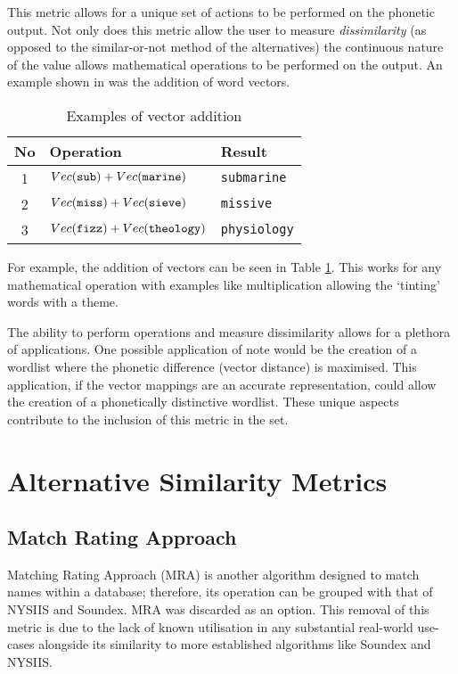 This metric allows for a unique set of actions to be performed on the phonetic output. Not only does this metric allow the user to measure \textit{dissimilarity} (as opposed to the similar-or-not method of the alternatives) the continuous nature of the value allows mathematical operations to be performed on the output. An example shown in \cite{parrish2017poetic} was the addition of word vectors.

\begin{table}[!htb]
    \centering
    \begin{tabular}{cll}
        No & Operation & Result \\
        \hline
        1  & $Vec(\verb|sub|) + Vec(\verb|marine|)$ & \verb|submarine| \\
        2  & $Vec(\verb|miss|) + Vec(\verb|sieve|)$ & \verb|missive| \\
        3  & $Vec(\verb|fizz|) + Vec(\verb|theology|)$ & \verb|physiology| \\
    \end{tabular}
    \caption{Examples of vector addition}
    \label{tab:vectorAdd}
\end{table}

For example, the addition of vectors can be seen in Table \ref{tab:vectorAdd}. This works for any mathematical operation with examples like multiplication allowing the `tinting' words with a theme.

The ability to perform operations and measure dissimilarity allows for a plethora of applications. One possible application of note would be the creation of a wordlist where the phonetic difference (vector distance) is maximised. This application, if the vector mappings are an accurate representation, could allow the creation of a phonetically distinctive wordlist. These unique aspects contribute to the inclusion of this metric in the set.

\section{Alternative Similarity Metrics}

\subsection{Match Rating Approach}
Matching Rating Approach (MRA) is another algorithm designed to match names within a database; therefore, its operation can be grouped with that of NYSIIS and Soundex. MRA was discarded as an option. This removal of this metric is due to the lack of known utilisation in any substantial real-world use-cases alongside its similarity to  more established algorithms like Soundex and NYSIIS.

